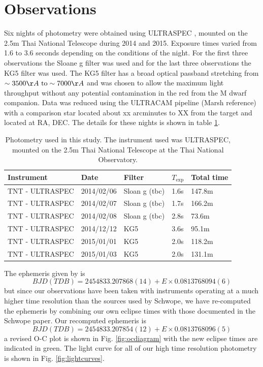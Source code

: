 \documentclass[a4paper,fleqn,usenatbib]{mnras}
\begin{document}
\section{Observations}
Six nights of photometry were obtained using ULTRASPEC \citep{ULTRASPEC}, mounted on the 2.5m Thai National Telescope during 2014 and 2015. Exposure times varied from 1.6 to 3.6 seconds depending on the conditions of the night. For the first three observations the Sloane g filter was used and for the last three observations the KG5 filter was used. The KG5 filter has a broad optical passband stretching from $\sim3500 \AA~ \mbox{to} \sim7000 \AA$ and was chosen to allow the maximum light throughput without any potential contamination in the red from the M dwarf companion.  Data was reduced using the ULTRACAM pipeline (Marsh reference) with a comparison star located about xx arcminutes to XX from the target and located at RA, DEC. The details for these nights is shown in table \ref{tab:photometry}. 

\begin{table}
  \caption{Photometry used in this study. The instrument used was ULTRASPEC, mounted on the 2.5m Thai National Telescope at the Thai National Observatory.}
  \begin{tabular}{ l  l  l  l  l  }
  \hline
  Instrument & Date & Filter & $T_{\mbox{exp}}$& Total time \\
  \hline
    TNT - ULTRASPEC & 2014/02/06 & Sloan g (tbc)& 1.6s & 147.8m \\
    TNT - ULTRASPEC & 2014/02/07 & Sloan g (tbc)& 1.7s & 166.2m \\
    TNT - ULTRASPEC & 2014/02/08 & Sloan g (tbc)& 2.8s & 73.6m \\
    TNT - ULTRASPEC & 2014/12/12 & KG5 & 3.6s & 95.1m \\
    TNT - ULTRASPEC & 2015/01/01 & KG5 & 2.0s & 118.2m \\
    TNT - ULTRASPEC & 2015/01/03 & KG5 & 2.0s & 131.1m \\
    
  \hline
  \end{tabular}
  \label{tab:photometry}
\end{table}

The ephemeris given by \citet{Schwope2015} is 
\begin{equation}BJD(TDB) = 2454833.207868(14) + E\times0.0813768094(6)\end{equation}
but since our observations have been taken with instruments operating at a much higher time resolution than the sources used by Schwope, we have re-computed the ephemeris by combining our own eclipse times with those documented in the Schwope paper. Our recomputed ephemeris is 
\begin{equation}BJD(TDB) = 2454833.207854(12) + E\times0.0813768096(5)\end{equation}
a revised O-C plot is shown in Fig. \ref{fig:ocdiagram} with the new eclipse times are indicated in green. The light curve for all of our high time resolution photometry is shown in Fig. \ref{fig:lightcurves}.
\end{document}
